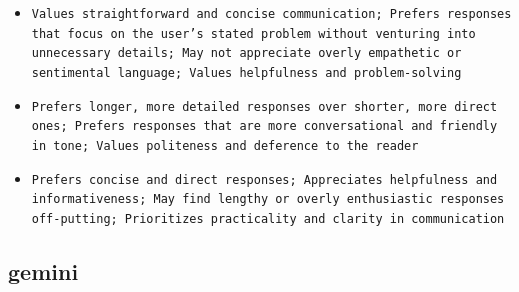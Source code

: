 \documentclass[11pt]{article}
\begin{document}
\begin{itemize}
\item \texttt{Values straightforward and concise communication; Prefers responses that focus on the user's stated problem without venturing into unnecessary details; May not appreciate overly empathetic or sentimental language; Values helpfulness and problem-solving}
\item \texttt{Prefers longer, more detailed responses over shorter, more direct ones; Prefers responses that are more conversational and friendly in tone; Values politeness and deference to the reader}
\item \texttt{Prefers concise and direct responses; Appreciates helpfulness and informativeness; May find lengthy or overly enthusiastic responses off-putting; Prioritizes practicality and clarity in communication}
\end{itemize}

\subsection{gemini}
\end{document}

